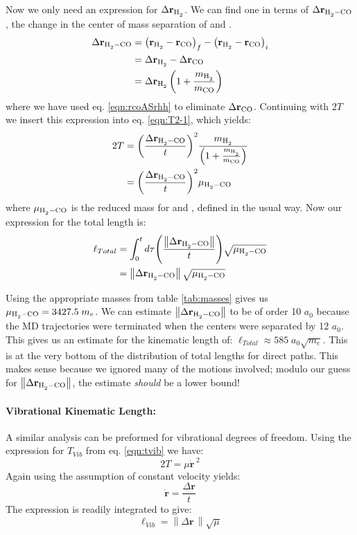 \documentclass[letterpaper,12pt]{article}
\renewcommand{\vec}[1]{\mathbf{#1}}
\newcommand{\norm}[1]{\left\lVert#1\right\rVert}
\renewcommand{\refeq}[1]{eq. \ref{eqn:#1}}
\begin{document}
Now we only need an expression for $\Delta \vec{r}\hh$. We can find one in terms of $\Delta \vec{r}\hhco$, the change in the center of mass separation of  and .
\begin{align}
\Delta \vec{r}\hhco &= {\left(\vec{r}\hh - \vec{r}\co \right)}_{f} - {\left(\vec{r}\hh - \vec{r}\co \right)}_{i} \\
&=\Delta \vec{r}\hh - \Delta \vec{r}\co \\
&=\Delta \vec{r}\hh \left(1 + \frac{m\hh}{m\co} \right)
\end{align}
where we have used \refeq{rcoASrhh} to eliminate $\Delta \vec{r}\co$. Continuing with $2T$ we insert this expression into \refeq{T2-1}, which yields:
\begin{align}
2T &= {\left( \frac{\Delta \vec{r}\hhco}{t}\right)}^2 \frac{m\hh}{ \left(1 + \frac{m\hh}{m\co} \right)} \\
&= {\left( \frac{\Delta \vec{r}\hhco}{t}\right)}^2 \mu\hhco
\end{align}
where $\mu\hhco$ is the reduced mass for  and , defined in the usual way. Now our expression for the total length is:
\begin{align}
\ell_{Total} &= \int^{t}_{0} d\tau {\left( \frac{\norm{\Delta \vec{r}\hhco}}{t}\right)} \sqrt{ \mu\hhco} \\
&= \norm{\Delta \vec{r}\hhco} \sqrt{ \mu\hhco}
\end{align}

Using the appropriate masses from table \ref{tab:masses} gives us $\mu\hhco = 3427.5\;m_e$. We can estimate $\norm{\Delta \vec{r}\hhco}$ to be of order 10 $a_0$ because the MD trajectories were terminated when the centers were separated by 12 $a_0$. This gives us an estimate for the kinematic length of: $\ell_{Total} \approx 585\;a_0 \sqrt{m_{e}}$. This is at the very bottom of the distribution of total lengths for direct paths. This makes sense because we ignored many of the motions involved; modulo our guess for $\norm{\Delta \vec{r}\hhco}$, the estimate \emph{should} be a lower bound!

\paragraph{Vibrational Kinematic Length:} A similar analysis can be preformed for vibrational degrees of freedom. Using the expression for $T_{Vib}$ from \refeq{tvib} we have:
\begin{equation}
2T = \mu \dot{\vec{r}}^{\;2}
\end{equation}
Again using the assumption of constant velocity yields:
\begin{equation}
\dot{\vec{r}} = \frac{\Delta \vec{r}}{t}
\end{equation}
The expression is readily integrated to give:
\begin{equation}
\ell_{Vib} = \norm{\Delta \vec{r}\,} \sqrt{\mu}
\end{equation}
\end{document}
